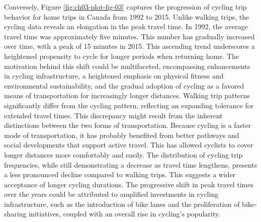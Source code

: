 \documentclass[
11pt, %
oneside, %
english, %
singlespacing, %
]{macthesis} %
\begin{document}
Conversely, Figure \ref{fig:ch03-plot-fig-03} captures the progression of cycling trip behavior for home trips in Canada from 1992 to 2015. Unlike walking trips, the cycling data reveals an elongation in the peak travel time. In 1992, the average travel time was approximately five minutes. This number has gradually increased over time, with a peak of 15 minutes in 2015. This ascending trend underscores a heightened propensity to cycle for longer periods when returning home. The motivation behind this shift could be multifaceted, encompassing enhancements in cycling infrastructure, a heightened emphasis on physical fitness and environmental sustainability, and the gradual adoption of cycling as a favored means of transportation for increasingly longer distances. Walking trip patterns significantly differ from the cycling pattern, reflecting an expanding tolerance for extended travel times. This discrepancy might result from the inherent distinctions between the two forms of transportation. Because cycling is a faster mode of transportation, it has probably benefited from better pathways and social developments that support active travel. This has allowed cyclists to cover longer distances more comfortably and easily. The distribution of cycling trip frequencies, while still demonstrating a decrease as travel time lengthens, presents a less pronounced decline compared to walking trips. This suggests a wider acceptance of longer cycling durations. The progressive shift in peak travel times over the years could be attributed to amplified investments in cycling infrastructure, such as the introduction of bike lanes and the proliferation of bike-sharing initiatives, coupled with an overall rise in cycling's popularity.
\end{document}
